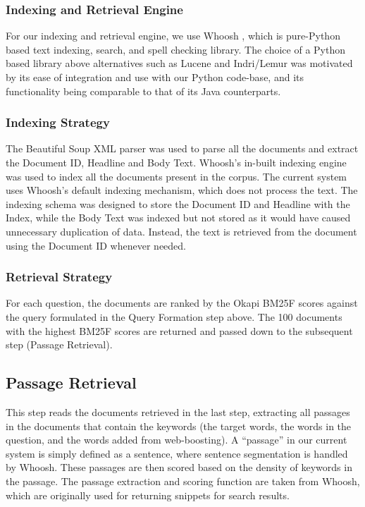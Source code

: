 \documentclass[11pt]{article}
\begin{document}
\subsubsection{Indexing and Retrieval Engine}
For our indexing and retrieval engine, we use Whoosh \cite{whoosh}, which is pure-Python based text indexing, search, and spell checking library. The choice of a Python based library above alternatives such as Lucene and Indri/Lemur was motivated by its ease of integration and use with our Python code-base, and its functionality being comparable to that of its Java counterparts.

\subsubsection{Indexing Strategy}
The Beautiful Soup XML parser \cite{bsoup} was used to parse all the documents and extract the Document ID, Headline and Body Text. Whoosh's in-built indexing engine was used to index all the documents present in the corpus. The current system uses Whoosh's default indexing mechanism, which does not process the text. The indexing schema was designed to store the Document ID and Headline with the Index, while the Body Text was indexed but not stored as it would have caused unnecessary duplication of data. Instead, the text is retrieved from the document using the Document ID whenever needed.

\subsubsection{Retrieval Strategy}
For each question, the documents are ranked by the Okapi BM25F scores against the query formulated in the Query Formation step above. The 100 documents with the highest BM25F scores are returned and passed down to the subsequent step (Passage Retrieval).

\subsection{Passage Retrieval}
This step reads the documents retrieved in the last step, extracting all passages in the documents that contain the keywords (the target words, the words in the question, and the words added from web-boosting). A ``passage'' in our current system is simply defined as a sentence, where sentence segmentation is handled by Whoosh. These passages are then scored based on the density of keywords in the passage. The passage extraction and scoring function are taken from Whoosh, which are originally used for returning snippets for search results.
\end{document}
